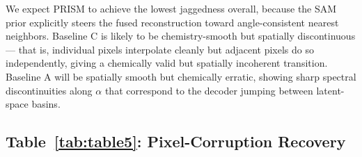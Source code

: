 \documentclass{article} %
\begin{document}
We expect PRISM to achieve the lowest jaggedness overall, because the SAM prior explicitly steers the fused reconstruction toward angle-consistent nearest neighbors. Baseline C is likely to be chemistry-smooth but spatially discontinuous --- that is, individual pixels interpolate cleanly but adjacent pixels do so independently, giving a chemically valid but spatially incoherent transition. Baseline A will be spatially smooth but chemically erratic, showing sharp spectral discontinuities along $\alpha$ that correspond to the decoder jumping between latent-space basins.

\subsection{Table~\ref{tab:table5}: Pixel-Corruption Recovery}
\end{document}
